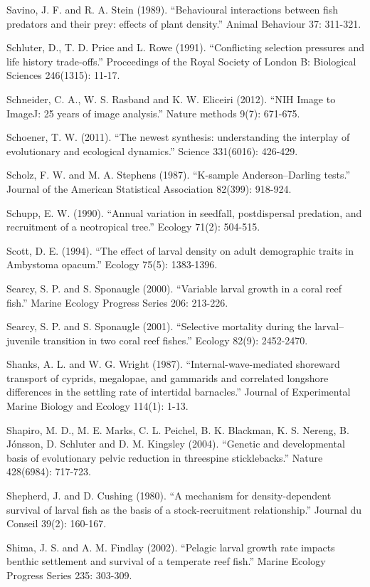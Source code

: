 \documentclass[]{book}
\begin{document}
Savino, J. F. and R. A. Stein (1989). ``Behavioural interactions between
fish predators and their prey: effects of plant density.'' Animal
Behaviour 37: 311-321.

Schluter, D., T. D. Price and L. Rowe (1991). ``Conflicting selection
pressures and life history trade-offs.'' Proceedings of the Royal
Society of London B: Biological Sciences 246(1315): 11-17.

Schneider, C. A., W. S. Rasband and K. W. Eliceiri (2012). ``NIH Image
to ImageJ: 25 years of image analysis.'' Nature methods 9(7): 671-675.

Schoener, T. W. (2011). ``The newest synthesis: understanding the
interplay of evolutionary and ecological dynamics.'' Science 331(6016):
426-429.

Scholz, F. W. and M. A. Stephens (1987). ``K-sample Anderson--Darling
tests.'' Journal of the American Statistical Association 82(399):
918-924.

Schupp, E. W. (1990). ``Annual variation in seedfall, postdispersal
predation, and recruitment of a neotropical tree.'' Ecology 71(2):
504-515.

Scott, D. E. (1994). ``The effect of larval density on adult demographic
traits in Ambystoma opacum.'' Ecology 75(5): 1383-1396.

Searcy, S. P. and S. Sponaugle (2000). ``Variable larval growth in a
coral reef fish.'' Marine Ecology Progress Series 206: 213-226.

Searcy, S. P. and S. Sponaugle (2001). ``Selective mortality during the
larval--juvenile transition in two coral reef fishes.'' Ecology 82(9):
2452-2470.

Shanks, A. L. and W. G. Wright (1987). ``Internal-wave-mediated
shoreward transport of cyprids, megalopae, and gammarids and correlated
longshore differences in the settling rate of intertidal barnacles.''
Journal of Experimental Marine Biology and Ecology 114(1): 1-13.

Shapiro, M. D., M. E. Marks, C. L. Peichel, B. K. Blackman, K. S.
Nereng, B. Jónsson, D. Schluter and D. M. Kingsley (2004). ``Genetic and
developmental basis of evolutionary pelvic reduction in threespine
sticklebacks.'' Nature 428(6984): 717-723.

Shepherd, J. and D. Cushing (1980). ``A mechanism for density-dependent
survival of larval fish as the basis of a stock-recruitment
relationship.'' Journal du Conseil 39(2): 160-167.

Shima, J. S. and A. M. Findlay (2002). ``Pelagic larval growth rate
impacts benthic settlement and survival of a temperate reef fish.''
Marine Ecology Progress Series 235: 303-309.
\end{document}

